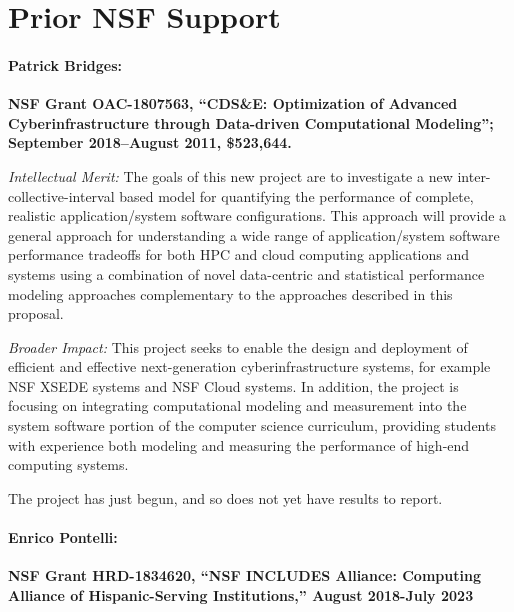 \section{Prior NSF Support}
\label{sec:prior}

\paragraph{Patrick Bridges:}
\textbf{NSF Grant OAC-1807563, ``CDS\&E: Optimization of Advanced Cyberinfrastructure through Data-driven Computational Modeling''; September 2018--August 2011, \$523,644.}

\noindent\textit{Intellectual Merit:} The goals of this new project are to investigate a new inter-collective-interval based model for quantifying the performance of complete, realistic application/system software configurations. This approach will provide a general approach for understanding a wide range of application/system software performance tradeoffs for both HPC and cloud computing applications and systems using a combination of novel data-centric and statistical performance modeling approaches complementary to the approaches described in this proposal.

\noindent\textit{Broader Impact:} This project seeks to enable the design and deployment of efficient and effective next-generation cyberinfrastructure systems, for example NSF XSEDE systems and NSF Cloud systems. In addition, the project is focusing on integrating computational modeling and measurement into the system software portion of the computer science curriculum, providing students with experience both modeling and measuring the performance of high-end computing systems. 

\noindent The project has just begun, and so does not yet have results to report.

\paragraph{Enrico Pontelli:}
\textbf{NSF Grant HRD-1834620, ``NSF INCLUDES Alliance: Computing Alliance of Hispanic-Serving Institutions,'' August 2018-July 2023}

